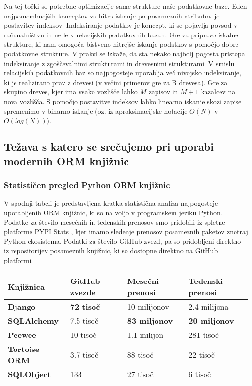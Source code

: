 \documentclass[a4paper,12pt,openright]{book}
\begin{document}
    Na tej točki so potrebne optimizacije same strukture naše podatkovne baze. Eden najpomembnejših konceptov za hitro iskanje po posameznih atributov je postavitev indeksov. Indeksiranje podatkov je koncept, ki se pojavlja povsod v računalništvu in ne le v relacijskih podatkovnih bazah. Gre za pripravo iskalne strukture, ki nam omogoča bistveno hitrejše iskanje podatkov s pomočjo dobre podatkovne strukture. V praksi se izkaže, da sta nekako najbolj pogosta pristopa indeksiranje z zgoščevalnimi strukturami in drevesnimi strukturami. V smislu relacijskih podatkovnih baz so najpogosteje uporablja več nivojsko indeksiranje, ki je realizirano prav z drevesi (v večini primerov gre za B drevesa). Gre za skupino dreves, kjer ima vsako vozlišče lahko $M$ zapisov in $M+1$ kazalcev na nova vozlišča. S pomočjo postavitve indeksov lahko linearno iskanje skozi zapise spremenimo v binarno iskanje (oz. iz aproksimacijske notacije $O(N)$ v $O(log(N))$).

    \subsection{Težava s katero se srečujemo pri uporabi modernih ORM knjižnic}

    \subsubsection{Statističen pregled Python ORM knjižnic}

    V spodnji tabeli je predstavljena kratka statistična analiza najpogosteje uporabljenih ORM knjižnic, ki so na voljo v programskem jeziku Python. Podatke za število mesečnih in tedenskih prenosov smo pridobili iz spletne platforme PYPI Stats \cite{pypistats}, kjer imamo sledenje prenosov posameznih paketov znotraj Python ekosistema. Podatki za število GitHub zvezd, pa so pridobljeni direktno iz repositorijev posameznih knjižnic, ki so dostopne direktno na GitHub platformi.
    
    \noindent
    \begin{center}
        \begin{tabular}{p{}|p{}|p{}|p{}}
          {\bf Knjižnica} & {\bf GitHub zvezde} & {\bf Mesečni prenosi} & {\bf Tedenski prenosi} \\ \hline
          {\bf Django \cite{DJANGO_GITHUB}} & \textbf{\num{72} tisoč} & \num{10} milijonov & \num{2,4} milijona \\
          {\bf SQLAlchemy \cite{SQLALCHEMY_GITHUB}} & \num{7,5} tisoč &  \textbf{\num{83} miljonov} & \textbf{\num{20} miljonov} \\
          {\bf Peewee \cite{PEEWEE_GITHUB}} & \num{10} tisoč & \num{1,1} milijon & \num{281} tisoč \\
          {\bf Tortoise ORM \cite{TORTOISE_GITHUB}} & \num{3,7} tisoč & \num{88} tisoč & \num{22} tisoč \\
          {\bf SQLObject \cite{SQLOBJECT_GITHUB}} & 133 & \num{27} tisoč & \num{6} tisoč \\
        \end{tabular}
    \end{center}
\end{document}
